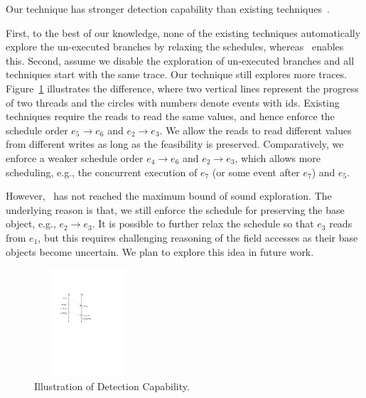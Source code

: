 \begin{mydiscussion}
Our technique has stronger detection capability than existing techniques~\cite{yannis,pldi14,Said:2011}.
\end{mydiscussion}

First, to the best of our knowledge, none of the existing techniques 
automatically explore the un-executed branches by relaxing the schedules, whereas \tool\  enables this.
Second, assume we disable the exploration of un-executed branches and all 
techniques start with the same trace. Our technique still explores more 
traces. Figure~\ref{fig:discuss} illustrates the difference, where two 
vertical lines represent the progress of two threads and the circles 
with numbers denote events with ids. 
Existing techniques require the reads to read the same values, and hence
enforce the schedule order $e_5 \rightarrow e_6$ and $e_2\rightarrow e_3$. 
We allow the reads to read different values from different writes as long as 
the feasibility is preserved. Comparatively, we enforce a weaker 
schedule order  $e_4 \rightarrow e_6$ and $e_2\rightarrow e_3$, which 
allows more scheduling, e.g., the concurrent execution of $e_7$ (or 
some event after $e_7$) and $e_5$.

However, \tool\  has not reached the maximum bound of sound exploration.
The underlying reason is that, we still enforce the schedule for 
preserving the base object, e.g., $e_2\rightarrow e_3$. It is possible 
to further relax the schedule so that $e_3$ reads from $e_1$, but 
this requires challenging reasoning of the field accesses as their base 
objects become uncertain. We plan to explore this idea in future work.




\begin{figure}[htp]
\centering
\includegraphics[width=4cm,height=4cm]{figs/Visio-discuss.pdf}
\caption{Illustration of Detection Capability.}\label{fig:discuss}
\vspace{-1em}
\end{figure}




